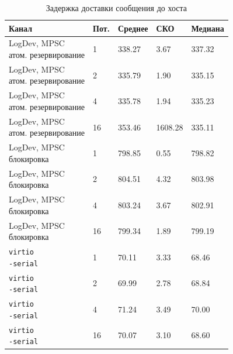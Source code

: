 \begin{table}[H]
    \centering
    \caption{Задержка доставки сообщения до хоста}
    \label{tab:delivery-latency}
    \small
    \setlength{\tabcolsep}{3pt}
    \begin{tabularx}{\textwidth}{|p{4.5cm}|p{1.2cm}|p{1.9cm}|p{1.9cm}|X|}
        \hline
        Канал & Пот. & Среднее & СКО & Медиана \\
        \hline
        \makecell[l]{LogDev, MPSC\\атом. резервирование} & 1 & 338.27 & 3.67 & 337.32 \\
        \hline
        \makecell[l]{LogDev, MPSC\\атом. резервирование} & 2 & 335.79 & 1.90 & 335.15 \\
        \hline
        \makecell[l]{LogDev, MPSC\\атом. резервирование} & 4 & 335.78 & 1.94 & 335.23 \\
        \hline
        \makecell[l]{LogDev, MPSC\\атом. резервирование} & 16 & 353.46 & 1608.28 & 335.11 \\
        \hline
        \makecell[l]{LogDev, MPSC\\блокировка} & 1 & 798.85 & 0.55 & 798.82 \\
        \hline
        \makecell[l]{LogDev, MPSC\\блокировка} & 2 & 804.51 & 4.32 & 803.98 \\
        \hline
        \makecell[l]{LogDev, MPSC\\блокировка} & 4 & 803.24 & 3.67 & 802.91 \\
        \hline
        \makecell[l]{LogDev, MPSC\\блокировка} & 16 & 799.34 & 1.89 & 799.19 \\
        \hline
        \makecell[l]{\texttt{virtio}\\\texttt{-serial}} & 1 & 70.11 & 3.33 & 68.46 \\
        \hline
        \makecell[l]{\texttt{virtio}\\\texttt{-serial}} & 2 & 69.99 & 2.78 & 68.84 \\
        \hline
        \makecell[l]{\texttt{virtio}\\\texttt{-serial}} & 4 & 71.24 & 3.49 & 70.00 \\
        \hline
        \makecell[l]{\texttt{virtio}\\\texttt{-serial}} & 16 & 70.07 & 3.10 & 68.60 \\
        \hline
    \end{tabularx}
\end{table}

